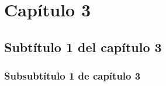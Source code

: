 \newpage

\begin{center}
\vspace*{15em}
{\huge\bfseries\color{blue}{Capítulo 3}\par}
{\huge\bfseries\color{blue}{Tercer Capítulo}\par}
\end{center}
\chapter{Capítulo 3}
\section{Subtítulo 1 del capítulo 3}
\subsection{Subsubtítulo 1 de capítulo 3}